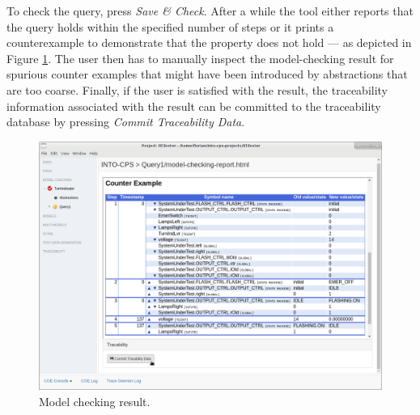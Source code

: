 %
%
%
To check the query, press \emph{Save \& Check}.
After a while the tool either reports that the query holds within the specified number of steps or it prints a counterexample to demonstrate that the property does not hold --- as depicted in
Figure \ref{figure:INTO-CPS-App:Add-LTL-Checked}.
The user then has to manually inspect the model-checking result for spurious counter examples
that might have been introduced by abstractions that are too coarse.
Finally, if the user is satisfied with the result, the traceability information associated
with the result can be committed to the traceability database by pressing
\emph{Commit Traceability Data}.
%
%
%
\begin{figure}[ht]
    \centerline{\includegraphics[scale=0.4]{figures/VSI-MC_Add-LTL-Checked}}
    \caption{Model checking result.}
    \label{figure:INTO-CPS-App:Add-LTL-Checked}
\end{figure}
%
%
%

